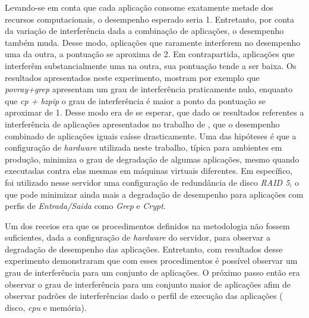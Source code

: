 Levando-se em conta que cada aplicação consome exatamente metade dos recursos computacionais, o desempenho esperado seria 1. Entretanto, por conta da variação de interferência dada a combinação de aplicações, o desempenho também muda. Desse modo, aplicações que raramente interferem no desempenho uma da outra, a pontuação se aproxima de 2. Em contrapartida, aplicações que interferêm substancialmente uma na outra, sua pontuação tende a ser baixa. Os resultados apresentados neste experimento, mostram por exemplo que \textit{povray+grep} apresentam um grau de interferência praticamente nulo, enquanto que \textit{cp + bzpip} o grau de interferência é maior a ponto da pontuação se aproximar de 1. Desse modo era de se esperar, que dado os resultados referentes a interferência de aplicações apresentados no trabalho de , que o desempenho combinado de aplicações iguais caísse drasticamente. Uma das hipóteses é que a configuração de \textit{hardware} utilizada neste trabalho, típica para ambientes em produção, minimiza o grau de degradação de algumas aplicações, mesmo quando executadas contra elas mesmas em máquinas virtuais diferentes. Em específico, foi utilizado nesse servidor uma configuração de redundância de disco \textit{RAID 5}, o que pode minimizar ainda mais a degradação de desempenho para aplicações com perfis de \textit{Entrada/Saida} como \textit{Grep} e \textit{Crypt}.


Um dos receios era que os procedimentos definidos na metodologia não fossem suficientes, dada a configuração de \textit{hardware} do servidor, para observar a degradação de desempenho das aplicações. Entretanto, com resultados desse experimento demonstraram que com esses procedimentos é possível observar um grau de interferência para um conjunto de aplicações. O próximo passo então era observar o grau de interferência para um conjunto maior de aplicações afim de observar padrões de interferências dado o perfil de execução das aplicações ( disco, \textit{cpu} e memória).

